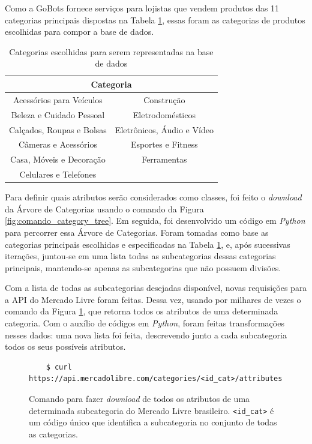 Como a GoBots fornece serviços para lojistas que vendem produtos das 11 categorias principais dispostas na Tabela \ref{table:categorias escolhidas}, essas foram as categorias de produtos escolhidas para compor a base de dados.

\begin{center}
\begin{table}[ht]
\caption{Categorias escolhidas para serem representadas na base de dados}
\label{table:categorias escolhidas}
\centering
    \begin{tabular}{|c|c|} 
     \hline
     \multicolumn{2}{|c|}{Categoria} \\
     \hline
     Acessórios para Veículos & Construção \\ 
     \hline
     Beleza e Cuidado Pessoal & Eletrodomésticos \\
     \hline
     Calçados, Roupas e Bolsas & Eletrônicos, Áudio e Vídeo \\
     \hline
     Câmeras e Acessórios & Esportes e Fitness\\
     \hline
     Casa, Móveis e Decoração & Ferramentas \\
     \hline
     Celulares e Telefones & \\
     \hline
    \end{tabular}
\end{table}
\end{center}

Para definir quais atributos serão considerados como classes, foi feito o \textit{download} da Árvore de Categorias usando o comando da Figura \ref{fig:comando_category_tree}. Em seguida, foi desenvolvido um código em \textit{Python} para percorrer essa Árvore de Categorias. Foram tomadas como base as categorias principais escolhidas e especificadas na Tabela \ref{table:categorias escolhidas}, e, após sucessivas iterações, juntou-se em uma lista todas as subcategorias dessas categorias principais, mantendo-se apenas as subcategorias que não possuem divisões.

Com a lista de todas as subcategorias desejadas disponível, novas requisições para a API do Mercado Livre foram feitas. Dessa vez, usando por milhares de vezes o comando da Figura \ref{fig:comando_category_attributes}, que retorna todos os atributos de uma determinada categoria. Com o auxílio de códigos em \textit{Python}, foram feitas transformações nesses dados: uma nova lista foi feita, descrevendo junto a cada subcategoria todos os seus possíveis atributos.

\begin{figure}[htb]
    \centering
    \color{black}
    \begin{verbatim}
    $ curl https://api.mercadolibre.com/categories/<id_cat>/attributes
    \end{verbatim}
    \caption{Comando para fazer \textit{download} de todos os atributos de uma determinada subcategoria do Mercado Livre brasileiro. \texttt{\textless id\_cat\textgreater} é um código único que identifica a subcategoria no conjunto de todas as categorias.}
    \label{fig:comando_category_attributes}
\end{figure}

